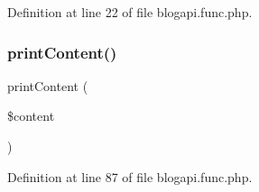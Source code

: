 Definition at line 22 of file blogapi.\+func.\+php.

\mbox{\label{blogapi_8func_8php_aee14687cb1bc033360baef8b634ab27e}} 
\subsubsection{\texorpdfstring{print\+Content()}{printContent()}}
{\footnotesize\ttfamily print\+Content (\begin{DoxyParamCaption}\item[{}]{\$content }\end{DoxyParamCaption})}



Definition at line 87 of file blogapi.\+func.\+php.

